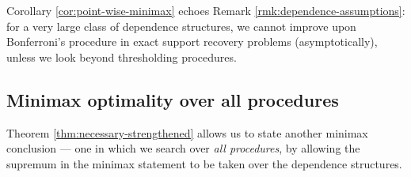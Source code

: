 \begin{remark}
Corollary \ref{cor:point-wise-minimax} echoes Remark \ref{rmk:dependence-assumptions}: for a very large class of dependence structures, we cannot improve upon Bonferroni's procedure in exact support recovery problems (asymptotically), unless we look beyond thresholding procedures.
\end{remark}



\subsection{Minimax optimality over all procedures}
\label{subsec:minimax-over-dependence}

Theorem \ref{thm:necessary-strengthened} allows us to state another minimax conclusion --- one in which we search over \emph{all procedures}, by allowing the supremum in the minimax statement to be taken over the dependence structures. 

